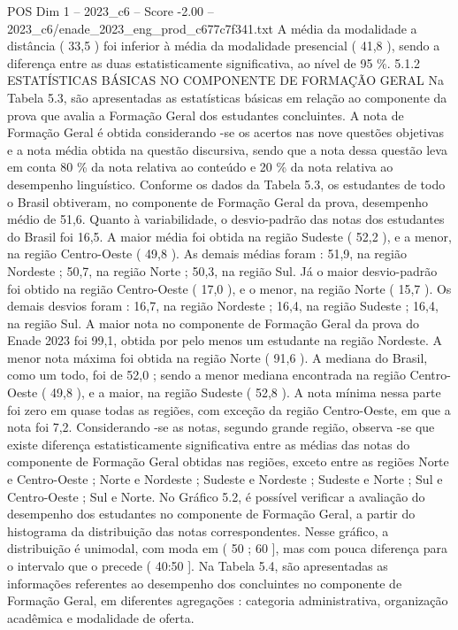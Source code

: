 \begin{textsample}{POS Dim 1 – 2023\_c6 – Score -2.00 – 2023\_c6/enade\_2023\_eng\_prod\_c677c7f341.txt}
A média da modalidade a distância ( 33,5 ) foi inferior à média da modalidade presencial ( 41,8 ), sendo a diferença entre as duas estatisticamente significativa, ao nível de 95 \%. 5.1.2 ESTATÍSTICAS BÁSICAS NO COMPONENTE DE FORMAÇÃO GERAL Na Tabela 5.3, são apresentadas as estatísticas básicas em relação ao componente da prova que avalia a Formação Geral dos estudantes concluintes.
A nota de Formação Geral é obtida considerando -se os acertos nas nove questões objetivas e a nota média obtida na questão discursiva, sendo que a nota dessa questão leva em conta 80 \% da nota relativa ao conteúdo e 20 \% da nota relativa ao desempenho linguístico.
Conforme os dados da Tabela 5.3, os estudantes de todo o Brasil obtiveram, no componente de Formação Geral da prova, desempenho médio de 51,6.
Quanto à variabilidade, o desvio-padrão das notas dos estudantes do Brasil foi 16,5.
A maior média foi obtida na região Sudeste ( 52,2 ), e a menor, na região Centro-Oeste ( 49,8 ).
As demais médias foram : 51,9, na região Nordeste ; 50,7, na região Norte ; 50,3, na região Sul.
Já o maior desvio-padrão foi obtido na região Centro-Oeste ( 17,0 ), e o menor, na região Norte ( 15,7 ).
Os demais desvios foram : 16,7, na região Nordeste ; 16,4, na região Sudeste ; 16,4, na região Sul.
A maior nota no componente de Formação Geral da prova do Enade 2023 foi 99,1, obtida por pelo menos um estudante na região Nordeste.
A menor nota máxima foi obtida na região Norte ( 91,6 ).
A mediana do Brasil, como um todo, foi de 52,0 ; sendo a menor mediana encontrada na região Centro-Oeste ( 49,8 ), e a maior, na região Sudeste ( 52,8 ).
A nota mínima nessa parte foi zero em quase todas as regiões, com exceção da região Centro-Oeste, em que a nota foi 7,2.
Considerando -se as notas, segundo grande região, observa -se que existe diferença estatisticamente significativa entre as médias das notas do componente de Formação Geral obtidas nas regiões, exceto entre as regiões Norte e Centro-Oeste ; Norte e Nordeste ; Sudeste e Nordeste ; Sudeste e Norte ; Sul e Centro-Oeste ; Sul e Norte.
No Gráfico 5.2, é possível verificar a avaliação do desempenho dos estudantes no componente de Formação Geral, a partir do histograma da distribuição das notas correspondentes.
Nesse gráfico, a distribuição é unimodal, com moda em ( 50 ; 60 ], mas com pouca diferença para o intervalo que o precede ( 40:50 ].
Na Tabela 5.4, são apresentadas as informações referentes ao desempenho dos concluintes no componente de Formação Geral, em diferentes agregações : categoria administrativa, organização acadêmica e modalidade de oferta.

\end{textsample}
